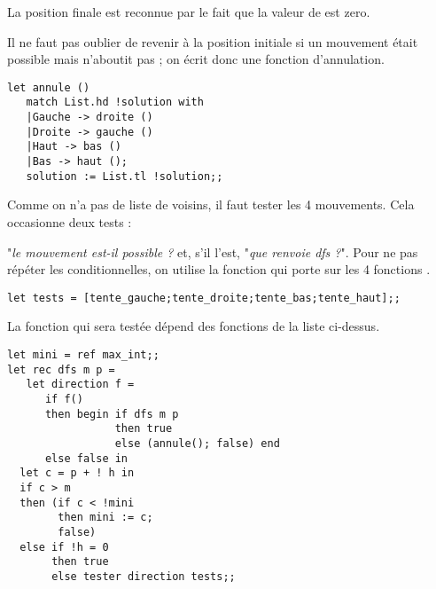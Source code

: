 \begin{Exercise} 
La position finale est reconnue par le fait que la valeur de  est zero.

Il ne faut pas oublier de revenir à la position initiale si un mouvement était possible mais n'aboutit pas ; on écrit donc une fonction d'annulation.
\begin{lstlisting}
let annule ()
   match List.hd !solution with
   |Gauche -> droite ()
   |Droite -> gauche ()
   |Haut -> bas ()
   |Bas -> haut ();
   solution := List.tl !solution;;
\end{lstlisting} 
Comme on n'a pas de liste de voisins, il faut tester les 4 mouvements. Cela occasionne deux tests : 

"{\it le mouvement est-il possible ?} et, s'il l'est, "{\it que renvoie dfs ?}". Pour ne pas répéter les conditionnelles, on utilise la fonction  qui porte sur les 4 fonctions .
\begin{lstlisting}
let tests = [tente_gauche;tente_droite;tente_bas;tente_haut];;
\end{lstlisting} 
La fonction qui sera testée dépend des fonctions de la liste ci-dessus.
\begin{lstlisting}
let mini = ref max_int;;
let rec dfs m p =
   let direction f =
      if f()
      then begin if dfs m p
                 then true
                 else (annule(); false) end
      else false in
  let c = p + ! h in
  if c > m
  then (if c < !mini 
        then mini := c; 
        false)
  else if !h = 0
       then true
       else tester direction tests;;
\end{lstlisting} 
\end{Exercise}
\newpage
